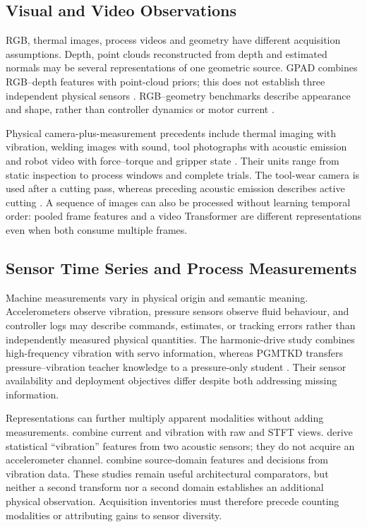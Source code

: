 \subsection{Visual and Video Observations}
RGB, thermal images, process videos and geometry have different acquisition assumptions. Depth, point clouds reconstructed from depth and estimated normals may be several representations of one geometric source. GPAD combines RGB--depth features with point-cloud priors; this does not establish three independent physical sensors \citep[PDF pp.~4--7]{P024}. RGB--geometry benchmarks describe appearance and shape, rather than controller dynamics or motor current \citep{Bergmann2022The,Bonfiglioli2023The}.

Physical camera-plus-measurement precedents include thermal imaging with vibration, welding images with sound, tool photographs with acoustic emission and robot video with force--torque and gripper state \citep{Huo2022Multisensor,Hua2026Weld,P045,Thoduka2024Handover}. Their units range from static inspection to process windows and complete trials. The tool-wear camera is used after a cutting pass, whereas preceding acoustic emission describes active cutting \citep[PDF pp.~19--22]{P045}. A sequence of images can also be processed without learning temporal order: pooled frame features and a video Transformer are different representations even when both consume multiple frames.

\subsection{Sensor Time Series and Process Measurements}

Machine measurements vary in physical origin and semantic meaning. Accelerometers observe vibration, pressure sensors observe fluid behaviour, and controller logs may describe commands, estimates, or tracking errors rather than independently measured physical quantities. The harmonic-drive study combines high-frequency vibration with servo information, whereas PGMTKD transfers pressure--vibration teacher knowledge to a pressure-only student \citep{Yang2024Fault,Li2025PGMTKD}. Their sensor availability and deployment objectives differ despite both addressing missing information.

Representations can further multiply apparent modalities without adding measurements. \citet{Kullu2022A} combine current and vibration with raw and STFT views. \citet{Wan2024Pipeline} derive statistical ``vibration'' features from two acoustic sensors; they do not acquire an accelerometer channel. \citet{Wang2025A} combine source-domain features and decisions from vibration data. These studies remain useful architectural comparators, but neither a second transform nor a second domain establishes an additional physical observation. Acquisition inventories must therefore precede counting modalities or attributing gains to sensor diversity.


